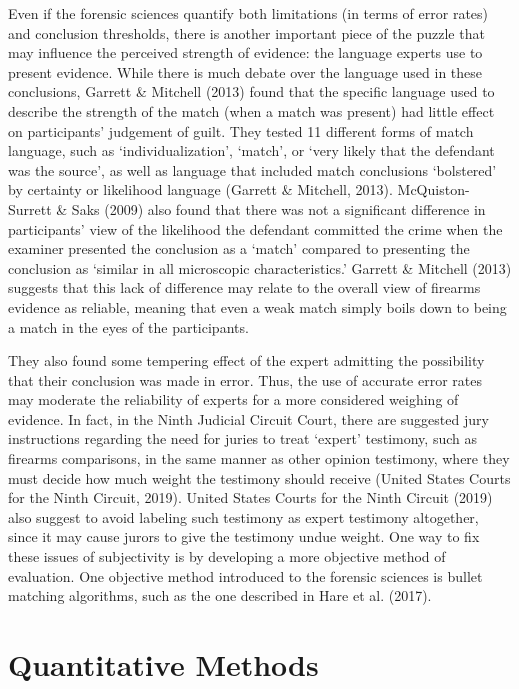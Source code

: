 \documentclass[print]{nuthesis}
\begin{document}
Even if the forensic sciences quantify both limitations (in terms of error rates) and conclusion thresholds, there is another important piece of the puzzle that may influence the perceived strength of evidence: the language experts use to present evidence.
While there is much debate over the language used in these conclusions, Garrett \& Mitchell (2013) found that the specific language used to describe the strength of the match (when a match was present) had little effect on participants' judgement of guilt. They tested 11 different forms of match language, such as `individualization', `match', or `very likely that the defendant was the source', as well as language that included match conclusions `bolstered' by certainty or likelihood language (Garrett \& Mitchell, 2013).
McQuiston-Surrett \& Saks (2009) also found that there was not a significant difference in participants' view of the likelihood the defendant committed the crime when the examiner presented the conclusion as a `match' compared to presenting the conclusion as `similar in all microscopic characteristics.'
Garrett \& Mitchell (2013) suggests that this lack of difference may relate to the overall view of firearms evidence as reliable, meaning that even a weak match simply boils down to being a match in the eyes of the participants.

They also found some tempering effect of the expert admitting the possibility that their conclusion was made in error.
Thus, the use of accurate error rates may moderate the reliability of experts for a more considered weighing of evidence.
In fact, in the Ninth Judicial Circuit Court, there are suggested jury instructions regarding the need for juries to treat `expert' testimony, such as firearms comparisons, in the same manner as other opinion testimony, where they must decide how much weight the testimony should receive (United States Courts for the Ninth Circuit, 2019).
United States Courts for the Ninth Circuit (2019) also suggest to avoid labeling such testimony as expert testimony altogether, since it may cause jurors to give the testimony undue weight.
One way to fix these issues of subjectivity is by developing a more objective method of evaluation.
One objective method introduced to the forensic sciences is bullet matching algorithms, such as the one described in Hare et al. (2017).

\hypertarget{quantitative-methods}{%
\section{Quantitative Methods}\label{quantitative-methods}}
\end{document}
